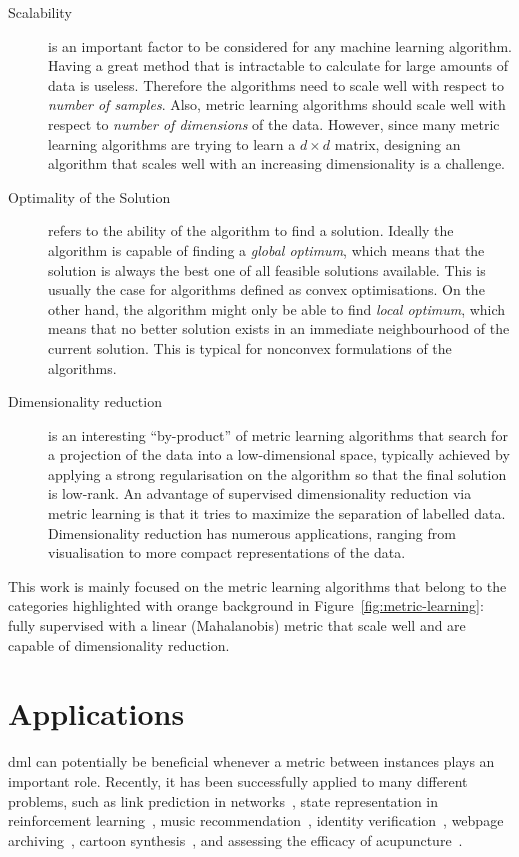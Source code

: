\begin{description}
\item [Scalability] is an important factor to be considered for any machine learning algorithm. Having a great method that is intractable to calculate for large amounts of data is useless. Therefore the algorithms need to scale well with respect to \textit{number of samples}. Also, metric learning algorithms should scale well with respect to \textit{number of dimensions} of the data. However, since many metric learning algorithms are trying to learn a $d \times d$ matrix, designing an algorithm that scales well with an increasing dimensionality is a challenge.

\item [Optimality of the Solution] refers to the ability of the algorithm to find a solution. Ideally the algorithm is capable of finding a \textit{global optimum}, which means that the solution is always the best one of all feasible solutions available. This is usually the case for algorithms defined as convex optimisations. On the other hand, the algorithm might only be able to find \textit{local optimum}, which means that no better solution exists in an immediate neighbourhood of the current solution. This is typical for nonconvex formulations of the algorithms.

\item [Dimensionality reduction] is an interesting ``by-product'' of metric learning algorithms that search for a projection of the data into a low-dimensional space, typically achieved by applying a strong regularisation on the algorithm so that the final solution is low-rank. An advantage of supervised dimensionality reduction via metric learning is that it tries to maximize the separation of labelled data. Dimensionality reduction has numerous applications, ranging from visualisation to more compact representations of the data.
\end{description}

This work is mainly focused on the metric learning algorithms that belong to the categories highlighted with orange background in Figure~\ref{fig:metric-learning}: fully supervised with a linear (Mahalanobis) metric that scale well and are capable of dimensionality reduction. 

\section{Applications} \label{chap:intro:applications}

\Ac{dml} can potentially be beneficial whenever a metric between instances plays an important role. Recently, it has been successfully applied to many different problems, such as link prediction in networks~\citep{shaw2011learning}, state representation in reinforcement learning~\citep{taylor2011metric}, music recommendation~\citep{mcfee2012learning}, identity verification~\citep{ben2012improved}, webpage archiving~\citep{law2012structural}, cartoon synthesis~\citep{yu2012semisupervised}, and assessing the efficacy of acupuncture~\citep{liang2012learning}.

